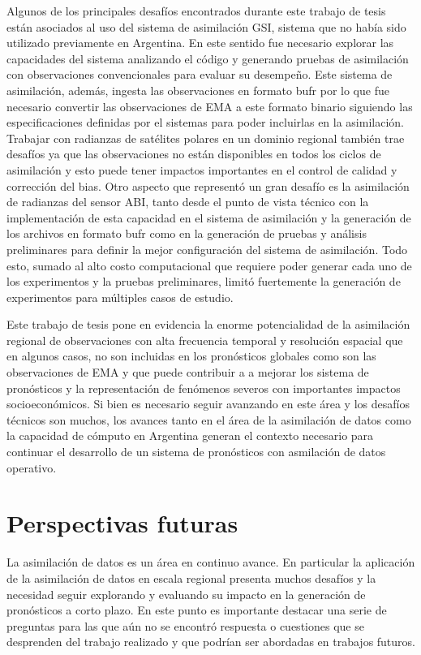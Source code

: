 \documentclass[12pt,oneside,a4paper]{reedthesis}
\begin{document}
Algunos de los principales desafíos encontrados durante este trabajo de tesis están asociados al uso del sistema de asimilación GSI, sistema que no había sido utilizado previamente en Argentina. En este sentido fue necesario explorar las capacidades del sistema analizando el código y generando pruebas de asimilación con observaciones convencionales para evaluar su desempeño. Este sistema de asimilación, además, ingesta las observaciones en formato bufr por lo que fue necesario convertir las observaciones de EMA a este formato binario siguiendo las especificaciones definidas por el sistemas para poder incluirlas en la asimilación. Trabajar con radianzas de satélites polares en un dominio regional también trae desafíos ya que las observaciones no están disponibles en todos los ciclos de asimilación y esto puede tener impactos importantes en el control de calidad y corrección del bias. Otro aspecto que representó un gran desafío es la asimilación de radianzas del sensor ABI, tanto desde el punto de vista técnico con la implementación de esta capacidad en el sistema de asimilación y la generación de los archivos en formato bufr como en la generación de pruebas y análisis preliminares para definir la mejor configuración del sistema de asimilación. Todo esto, sumado al alto costo computacional que requiere poder generar cada uno de los experimentos y la pruebas preliminares, limitó fuertemente la generación de experimentos para múltiples casos de estudio.

Este trabajo de tesis pone en evidencia la enorme potencialidad de la asimilación regional de observaciones con alta frecuencia temporal y resolución espacial que en algunos casos, no son incluidas en los pronósticos globales como son las observaciones de EMA y que puede contribuir a a mejorar los sistema de pronósticos y la representación de fenómenos severos con importantes impactos socioeconómicos. Si bien es necesario seguir avanzando en este área y los desafíos técnicos son muchos, los avances tanto en el área de la asimilación de datos como la capacidad de cómputo en Argentina generan el contexto necesario para continuar el desarrollo de un sistema de pronósticos con asmilación de datos operativo.

\hypertarget{perspectivas-futuras}{%
\section{Perspectivas futuras}\label{perspectivas-futuras}}

La asimilación de datos es un área en continuo avance. En particular la aplicación de la asimilación de datos en escala regional presenta muchos desafíos y la necesidad seguir explorando y evaluando su impacto en la generación de pronósticos a corto plazo. En este punto es importante destacar una serie de preguntas para las que aún no se encontró respuesta o cuestiones que se desprenden del trabajo realizado y que podrían ser abordadas en trabajos futuros.
\end{document}
